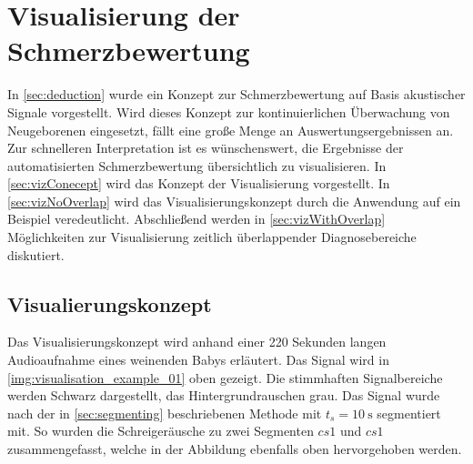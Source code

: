 \chapter{Visualisierung der Schmerzbewertung}
\label{sec:visualisation}

In \autoref{sec:deduction} wurde ein Konzept zur Schmerzbewertung auf Basis akustischer Signale vorgestellt. Wird dieses Konzept zur kontinuierlichen Überwachung von Neugeborenen eingesetzt, fällt eine große Menge an Auswertungsergebnissen an. Zur schnelleren Interpretation ist es wünschenswert, die Ergebnisse der automatisierten Schmerzbewertung übersichtlich zu visualisieren. In \autoref{sec:vizConecept} wird das Konzept der Visualisierung vorgestellt. In \autoref{sec:vizNoOverlap} wird das Visualisierungskonzept durch die Anwendung auf ein Beispiel veredeutlicht. Abschließend werden in \autoref{sec:vizWithOverlap} Möglichkeiten zur Visualisierung zeitlich überlappender Diagnosebereiche diskutiert.

\section{Visualierungskonzept}
\label{sec:vizConecept}

Das Visualisierungskonzept wird anhand einer 220 Sekunden langen Audioaufnahme eines weinenden Babys erläutert. Das Signal wird in \autoref{img:visualisation_example_01} oben gezeigt. Die stimmhaften Signalbereiche werden Schwarz dargestellt, das Hintergrundrauschen grau. Das Signal wurde nach der in \autoref{sec:segmenting} beschriebenen Methode mit $t_{s} = \SI{10}{\second}$ segmentiert mit. So wurden die Schreigeräusche zu zwei Segmenten $cs1$ und $cs1$ zusammengefasst, welche in der Abbildung ebenfalls oben hervorgehoben werden.

